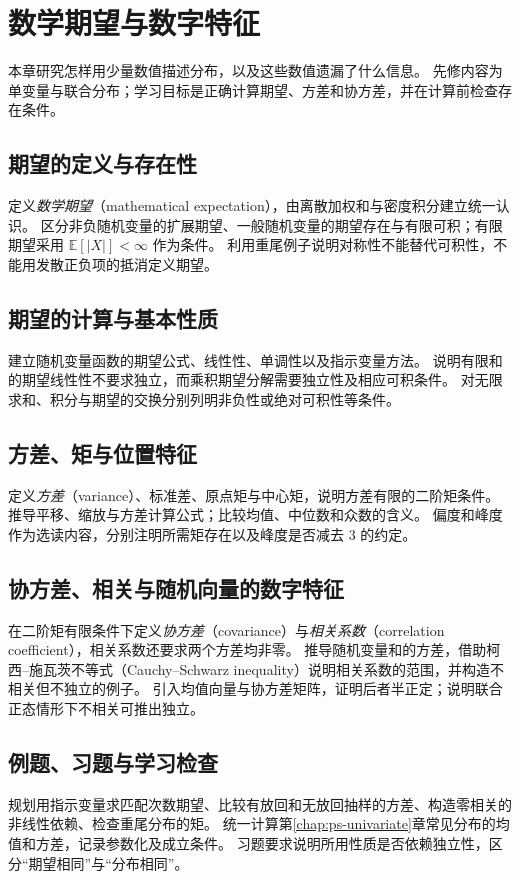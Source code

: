 \setcounter{chapter}{4} %
\chapter{数学期望与数字特征}
\label{chap:ps-moments}

本章研究怎样用少量数值描述分布，以及这些数值遗漏了什么信息。
先修内容为单变量与联合分布；学习目标是正确计算期望、方差和协方差，并在计算前检查存在条件。

\section{期望的定义与存在性}
\label{sec:ps-expectation-definition}
定义\emph{数学期望}（mathematical expectation），由离散加权和与密度积分建立统一认识。
区分非负随机变量的扩展期望、一般随机变量的期望存在与有限可积；有限期望采用 $\mathbb E[|X|]<\infty$ 作为条件。
利用重尾例子说明对称性不能替代可积性，不能用发散正负项的抵消定义期望。

\section{期望的计算与基本性质}
\label{sec:ps-expectation-properties}
建立随机变量函数的期望公式、线性性、单调性以及指示变量方法。
说明有限和的期望线性性不要求独立，而乘积期望分解需要独立性及相应可积条件。
对无限求和、积分与期望的交换分别列明非负性或绝对可积性等条件。

\section{方差、矩与位置特征}
\label{sec:ps-variance-moments}
定义\emph{方差}（variance）、标准差、原点矩与中心矩，说明方差有限的二阶矩条件。
推导平移、缩放与方差计算公式；比较均值、中位数和众数的含义。
偏度和峰度作为选读内容，分别注明所需矩存在以及峰度是否减去 $3$ 的约定。

\section{协方差、相关与随机向量的数字特征}
\label{sec:ps-covariance-correlation}
在二阶矩有限条件下定义\emph{协方差}（covariance）与\emph{相关系数}（correlation coefficient），相关系数还要求两个方差均非零。
推导随机变量和的方差，借助柯西--施瓦茨不等式（Cauchy--Schwarz inequality）说明相关系数的范围，并构造不相关但不独立的例子。
引入均值向量与协方差矩阵，证明后者半正定；说明联合正态情形下不相关可推出独立。

\section{例题、习题与学习检查}
规划用指示变量求匹配次数期望、比较有放回和无放回抽样的方差、构造零相关的非线性依赖、检查重尾分布的矩。
统一计算第\ref{chap:ps-univariate}章常见分布的均值和方差，记录参数化及成立条件。
习题要求说明所用性质是否依赖独立性，区分“期望相同”与“分布相同”。






